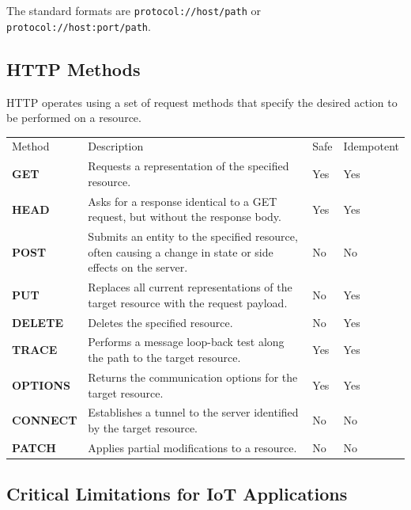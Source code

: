 \documentclass[a4paper, 12pt]{book} %
\begin{document}
The standard formats are \texttt{protocol://host/path} or
\texttt{protocol://host:port/path}.

\subsection{HTTP Methods}\label{http-methods}

HTTP operates using a set of request methods that specify the desired
action to be performed on a resource.

\begin{longtable}[]{@{}
  >{\raggedright\arraybackslash}p{}
  >{\raggedright\arraybackslash}p{}
  >{\raggedright\arraybackslash}p{}
  >{\raggedright\arraybackslash}p{}@{}}
\toprule\noalign{}
\endhead
\bottomrule\noalign{}
\endlastfoot
Method & Description & Safe & Idempotent \\
\textbf{GET} & Requests a representation of the specified resource. &
Yes & Yes \\
\textbf{HEAD} & Asks for a response identical to a GET request, but
without the response body. & Yes & Yes \\
\textbf{POST} & Submits an entity to the specified resource, often
causing a change in state or side effects on the server. & No & No \\
\textbf{PUT} & Replaces all current representations of the target
resource with the request payload. & No & Yes \\
\textbf{DELETE} & Deletes the specified resource. & No & Yes \\
\textbf{TRACE} & Performs a message loop-back test along the path to the
target resource. & Yes & Yes \\
\textbf{OPTIONS} & Returns the communication options for the target
resource. & Yes & Yes \\
\textbf{CONNECT} & Establishes a tunnel to the server identified by the
target resource. & No & No \\
\textbf{PATCH} & Applies partial modifications to a resource. & No &
No \\
\end{longtable}

\subsection{Critical Limitations for IoT
Applications}\label{critical-limitations-for-iot-applications}
\end{document}
